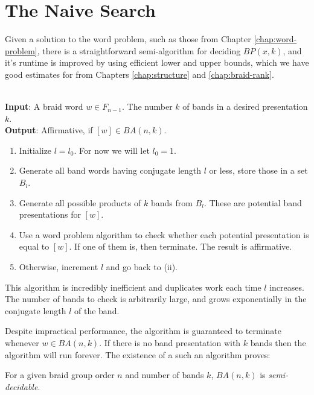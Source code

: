 \documentclass[12pt]{thesis}
\begin{document}
\section{The Naive Search}

\label{naiive-search}

Given a solution to the word problem, such as those from Chapter \ref{chap:word-problem},
there is a straightforward semi-algorithm for deciding $BP(x, k)$,
and it's runtime is improved by using
efficient lower and upper bounds, which we have good estimates for from Chapters \ref{chap:structure} and \ref{chap:braid-rank}.

\begin{algorithm}

    \label{algo:naive-search}
    ~\\
    \textbf{Input}: A braid word $w \in F_{n-1}$. The number $k$ of bands in a desired presentation $k$.
    ~\\
    \textbf{Output}: Affirmative, if $[w] \in BA(n, k)$.

\begin{enumerate}
    \item Initialize $l = l_{0}$.
          For now we will let $l_{0} = 1$.

    \item Generate all band words having conjugate length $l$ or less,
        store those in a set $B_{l}$.

    \item Generate all possible products of $k$ bands from $B_{l}$.
          These are potential band presentations for $[w]$.

    \item Use a word problem algorithm to check whether each potential 
          presentation is equal to $[w]$.
          If one of them is, then terminate. The result is affirmative.

      \item Otherwise, increment $l$ and go back to (ii).
\end{enumerate}

\end{algorithm}

This algorithm is incredibly inefficient and duplicates work each time $l$ increases.
The number of bands to check is arbitrarily large,
and grows exponentially in the conjugate length $l$ of the band.

Despite impractical performance, the algorithm is guaranteed to terminate whenever
$w \in BA(n, k)$.
If there is no band presentation with $k$ bands
then the algorithm will run forever.
The existence of a such an algorithm proves:
\begin{proposition}
    For a given braid group order $n$ and number of bands $k$, $BA(n, k)$ is \textit{semi-decidable}.
\end{proposition}
\end{document}

